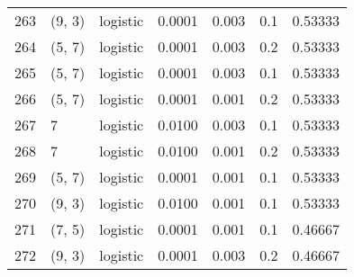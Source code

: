 \begin{tabular}{lllrrrr}
263 &      (9, 3) &  logistic &  0.0001 &  0.003 &  0.1 &   0.53333 \\
264 &      (5, 7) &  logistic &  0.0001 &  0.003 &  0.2 &   0.53333 \\
265 &      (5, 7) &  logistic &  0.0001 &  0.003 &  0.1 &   0.53333 \\
266 &      (5, 7) &  logistic &  0.0001 &  0.001 &  0.2 &   0.53333 \\
267 &           7 &  logistic &  0.0100 &  0.003 &  0.1 &   0.53333 \\
268 &           7 &  logistic &  0.0100 &  0.001 &  0.2 &   0.53333 \\
269 &      (5, 7) &  logistic &  0.0001 &  0.001 &  0.1 &   0.53333 \\
270 &      (9, 3) &  logistic &  0.0100 &  0.001 &  0.1 &   0.53333 \\
271 &      (7, 5) &  logistic &  0.0001 &  0.001 &  0.1 &   0.46667 \\
272 &      (9, 3) &  logistic &  0.0001 &  0.003 &  0.2 &   0.46667 \\
\bottomrule
\end{tabular}
